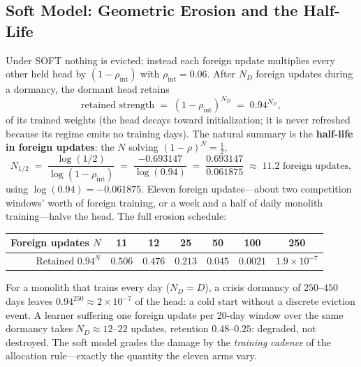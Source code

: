 \subsection{Soft Model: Geometric Erosion and the Half-Life}

Under SOFT nothing is evicted; instead each foreign update multiplies every
other held head by $(1 - \rho_{\mathrm{int}})$ with
$\rho_{\mathrm{int}} = 0.06$. After $N_D$ foreign updates during a dormancy,
the dormant head retains
\begin{equation}
\label{eq:dd2-soft-retention}
\text{retained strength} \;=\; (1 - \rho_{\mathrm{int}})^{N_D} \;=\; 0.94^{N_D},
\end{equation}
of its trained weights (the head decays toward initialization; it is never
refreshed because its regime emits no training days). The natural summary is
the \textbf{half-life in foreign updates}: the $N$ solving
$(1-\rho)^{N} = \tfrac12$,
\begin{equation}
\label{eq:dd2-halflife}
N_{1/2} \;=\; \frac{\log(1/2)}{\log(1 - \rho_{\mathrm{int}})}
\;=\; \frac{-0.693147}{\log(0.94)}
\;=\; \frac{0.693147}{0.061875}
\;\approx\; 11.2 \text{ foreign updates},
\end{equation}
using $\log(0.94) = -0.061875$. Eleven foreign updates---about two competition
windows' worth of foreign training, or a week and a half of daily monolith
training---halve the head. The full erosion schedule:

\begin{center}
\begin{tabular}{rcccccc}
\toprule
Foreign updates $N$ & 11 & 12 & 25 & 50 & 100 & 250 \\
\midrule
Retained $0.94^{N}$ & $0.506$ & $0.476$ & $0.213$ & $0.045$ & $0.0021$ & $1.9 \times 10^{-7}$ \\
\bottomrule
\end{tabular}
\end{center}

For a monolith that trains every day ($N_D = D$), a crisis dormancy of
$250$--$450$ days leaves $0.94^{250} \approx 2 \times 10^{-7}$ of the head:
a cold start without a discrete eviction event. A learner suffering one
foreign update per 20-day window over the same dormancy takes
$N_D \approx 12$--$22$ updates, retention $0.48$--$0.25$: degraded, not
destroyed. The soft model grades the damage by the \emph{training cadence}
of the allocation rule---exactly the quantity the eleven arms vary.

